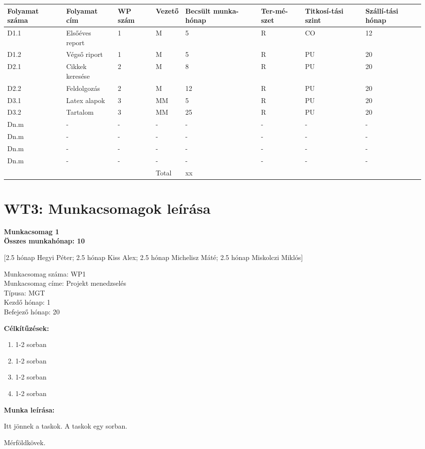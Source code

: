 \documentclass{report}
\begin{document}
\Large
\begin{tabular}{|p{}|p{}|p{}|p{}|p{}|p{}|p{}|p{}|}
\hline
\textbf{Folyamat száma}  & \textbf{Folyamat cím} & \textbf{WP szám} & \textbf{Vezető} & \textbf{Becsült munka-hónap} & \textbf{Ter-mé-szet} & \textbf{Titkosí-tási szint} & \textbf{Szállí-tási hónap} \\[3ex]
\hline
D1.1 & Elsőéves report & 1 & M & 5 & R & CO & 12 \\ [3ex]
\hline
D1.2 & Végső riport & 1 & M & 5 & R & PU & 20 \\ [3ex]
\hline
D2.1 & Cikkek keresése & 2 & M & 8 & R & PU & 20 \\ [3ex]
\hline
D2.2 & Feldolgozás & 2 & M & 12 & R & PU & 20 \\ [3ex]
\hline
D3.1 & Latex alapok & 3 & MM & 5 & R & PU & 20 \\ [3ex]
\hline
D3.2 & Tartalom & 3 & MM & 25 & R & PU & 20 \\ [3ex]
\hline
Dn.m & - & - & - & - & - & - & - \\ [3ex]
\hline
Dn.m & - & - & - & - & - & - & - \\ [3ex]
\hline
Dn.m & - & - & - & - & - & - & - \\ [3ex]
\hline
Dn.m & - & - & - & - & - & - & - \\ [3ex]
\hline
\multicolumn{3}{c|}{}& Total & xx & \multicolumn{2}{|c}{} \\ [3ex]
\cline{4-5}
\end{tabular}
\normalsize

\newpage
\section*{WT3: Munkacsomagok leírása}


\Large{\textbf{Munkacsomag 1}}
\bigskip\\
\large{\textbf{Összes munkahónap: 10}}
\bigskip 

[2.5 hónap Hegyi Péter; 2.5 hónap Kiss Alex; 2.5 hónap Michelisz Máté; 2.5 hónap Miskolczi Miklós]
\vspace{1cm}

Munkacsomag száma: WP1 \\
Munkacsomag címe: Projekt menedzselés \\
Típusa: MGT \\
Kezdő hónap: 1 \\
Befejező hónap: 20 \\
\medskip

\textbf{Célkítűzések:}
\medskip

\begin{enumerate}
    \item 1-2 sorban
    \item 1-2 sorban
    \item 1-2 sorban
    \item 1-2 sorban
\end{enumerate}


\textbf{Munka leírása:}
\medskip

Itt jönnek a taskok. 
A taskok egy sorban.

\medskip
Mérföldkövek.
\end{document}
